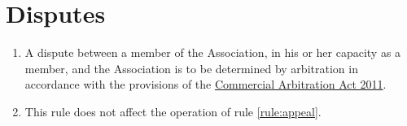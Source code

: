 \section{Disputes}
\label{rule:disputes}

\begin{enumerate}
	\item A dispute between a member of the Association, in his or her capacity as a member, and the Association is to be determined by arbitration in accordance with the provisions of the \href{https://www.legislation.tas.gov.au/view/html/inforce/current/act-2011-013}{Commercial Arbitration Act 2011}.
	\item This rule does not affect the operation of rule \ref{rule:appeal}.
\end{enumerate}